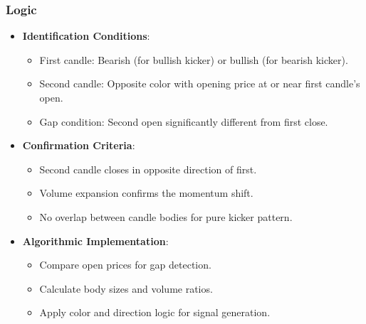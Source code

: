\documentclass[12pt]{article}
\begin{document}
\subsubsection{Logic}
\begin{itemize}
\item \textbf{Identification Conditions}:
  \begin{itemize}
  \item First candle: Bearish (for bullish kicker) or bullish (for bearish kicker).
  \item Second candle: Opposite color with opening price at or near first candle's open.
  \item Gap condition: Second open significantly different from first close.
  \end{itemize}
\item \textbf{Confirmation Criteria}:
  \begin{itemize}
  \item Second candle closes in opposite direction of first.
  \item Volume expansion confirms the momentum shift.
  \item No overlap between candle bodies for pure kicker pattern.
  \end{itemize}
\item \textbf{Algorithmic Implementation}:
  \begin{itemize}
  \item Compare open prices for gap detection.
  \item Calculate body sizes and volume ratios.
  \item Apply color and direction logic for signal generation.
  \end{itemize}
\end{itemize}
\end{document}
